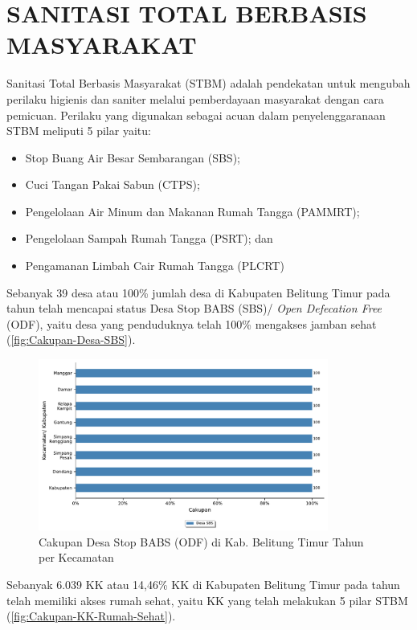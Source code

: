 \section{SANITASI TOTAL BERBASIS MASYARAKAT}
Sanitasi Total Berbasis Masyarakat (STBM) adalah pendekatan untuk mengubah perilaku higienis dan saniter melalui pemberdayaan masyarakat dengan cara pemicuan. 
Perilaku yang digunakan sebagai acuan dalam penyelenggaranaan STBM meliputi 5 pilar yaitu:
\begin{itemize}
	\item Stop Buang Air Besar Sembarangan (SBS);
	\item Cuci Tangan Pakai Sabun (CTPS);
	\item Pengelolaan Air Minum dan Makanan Rumah Tangga (PAMMRT);
	\item Pengelolaan Sampah Rumah Tangga (PSRT); dan
	\item Pengamanan Limbah Cair Rumah Tangga (PLCRT)
\end{itemize} 

Sebanyak 39 desa atau 100\% jumlah desa di Kabupaten Belitung Timur pada tahun \tP telah mencapai status Desa Stop BABS (SBS)/ \emph{Open Defecation Free} (ODF), yaitu desa yang penduduknya telah 100\% mengakses jamban sehat (\autoref{fig:Cakupan-Desa-SBS}).

\begin{figure}[H]
	\centering
    \includegraphics[width=0.85\textwidth]{bab_07/bab_07_03a_desaSBS}
	\caption{Cakupan Desa Stop BABS (ODF) di Kab. Belitung Timur Tahun \tP per Kecamatan}
	\label{fig:Cakupan-Desa-SBS}
\end{figure}

Sebanyak 6.039 KK atau 14,46\% KK di Kabupaten Belitung Timur pada tahun \tP telah memiliki akses rumah sehat, yaitu KK yang telah melakukan 5 pilar STBM (\autoref{fig:Cakupan-KK-Rumah-Sehat}).

